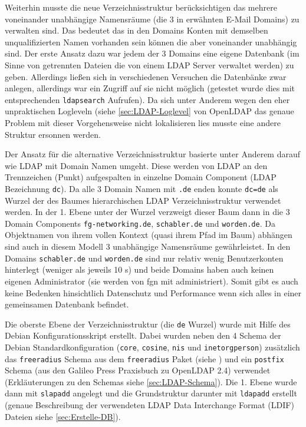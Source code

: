\documentclass[11pt,a4paper,titlepage=firstiscover]{scrartcl} %
\begin{document}
Weiterhin musste die neue Verzeichnisstruktur berücksichtigen das mehrere voneinander unabhängige Namensräume (die 3 in  erwähnten E-Mail Domains) zu verwalten sind. Das bedeutet das in den Domains Konten mit demselben unqualifizierten Namen vorhanden sein können die aber voneinander unabhängig sind. Der erste Ansatz dazu war jedem der 3 Domains eine eigene Datenbank (im Sinne von getrennten Dateien die von einem LDAP Server verwaltet werden) zu geben. Allerdings ließen sich in verschiedenen Versuchen die Datenbänke zwar anlegen, allerdings war ein Zugriff auf sie nicht möglich (getestet wurde dies mit entsprechenden \texttt{ldapsearch} Aufrufen). Da sich unter Anderem wegen den eher unpraktischen Logleveln (siehe \autoref{sec:LDAP-Loglevel} von OpenLDAP das genaue Problem mit dieser Vorgehensweise nicht lokalisieren lies musste eine andere Struktur ersonnen werden.

Der Ansatz für die alternative Verzeichnisstruktur basierte unter Anderem darauf wie LDAP mit Domain Namen umgeht. Diese werden von LDAP an den Trennzeichen (Punkt) aufgespalten in einzelne Domain Component (LDAP Bezeichnung \texttt{dc}). Da alle 3 Domain Namen mit \texttt{.de} enden konnte \texttt{dc=de} als Wurzel der des Baumes hierarchischen LDAP Verzeichnisstruktur verwendet werden. In der 1. Ebene unter der Wurzel verzweigt dieser Baum dann in die 3 Domain Components  \texttt{fg-networking.de}, \texttt{schabler.de} und \texttt{worden.de}. Da Objektnamen von ihrem vollen Kontext (quasi ihrem Pfad im Baum) abhängen sind auch in diesem Modell 3 unabhängige Namensräume gewährleistet. In den Domains \texttt{schabler.de} und \texttt{worden.de} sind nur relativ wenig Benutzerkonten hinterlegt (weniger als jeweils 10 s) und beide Domains haben auch keinen eigenen Administrator (sie werden von fgn mit administriert). Somit gibt es auch keine Bedenken hinsichtlich Datenschutz und Performance wenn sich alles in einer gemeinsamen Datenbank befindet.

Die oberste Ebene der Verzeichnisstruktur (die \texttt{de} Wurzel) wurde mit Hilfe des Debian Konfigurationsskript erstellt. Dabei wurden neben den 4 Schema der Debian Standardkonfiguration (\texttt{core}, \texttt{cosine}, \texttt{nis} und \texttt{inetorgperson}) zusätzlich das \texttt{freeradius} Schema aus dem \texttt{freeradius} Paket (siehe ) und ein \texttt{postfix} Schema (aus den Galileo Press Praxisbuch zu OpenLDAP 2.4) verwendet (Erkläuterungen zu den Schemas siehe \autoref{sec:LDAP-Schema}). Die 1. Ebene wurde dann mit \texttt{slapadd} angelegt und die Grundstruktur darunter mit \texttt{ldapadd} erstellt (genaue Beschreibung der verwendeten LDAP Data Interchange Format (LDIF) Dateien siehe \autoref{sec:Erstelle-DB}).
\end{document}
